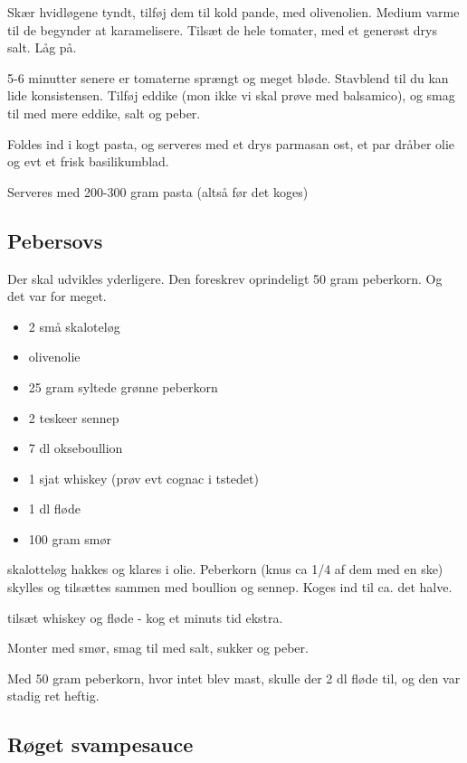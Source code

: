 \documentclass[
  letterpaper,
  DIV=11,
  numbers=noendperiod]{scrreprt}
\providecommand{\tightlist}{%
  \setlength{\itemsep}{0pt}\setlength{\parskip}{0pt}}\usepackage{longtable,booktabs,array}
\begin{document}
Skær hvidløgene tyndt, tilføj dem til kold pande, med olivenolien.
Medium varme til de begynder at karamelisere. Tilsæt de hele tomater,
med et generøst drys salt. Låg på.

5-6 minutter senere er tomaterne sprængt og meget bløde. Stavblend til
du kan lide konsistensen. Tilføj eddike (mon ikke vi skal prøve med
balsamico), og smag til med mere eddike, salt og peber.

Foldes ind i kogt pasta, og serveres med et drys parmasan ost, et par
dråber olie og evt et frisk basilikumblad.

Serveres med 200-300 gram pasta (altså før det koges)

\hypertarget{pebersovs}{%
\subsection{Pebersovs}\label{pebersovs}}

Der skal udvikles yderligere. Den foreskrev oprindeligt 50 gram
peberkorn. Og det var for meget.

\begin{itemize}
\tightlist
\item
  2 små skaloteløg
\item
  olivenolie
\item
  25 gram syltede grønne peberkorn
\item
  2 teskeer sennep
\item
  7 dl okseboullion
\item
  1 sjat whiskey (prøv evt cognac i tstedet)
\item
  1 dl fløde
\item
  100 gram smør
\end{itemize}

skalotteløg hakkes og klares i olie. Peberkorn (knus ca 1/4 af dem med
en ske) skylles og tilsættes sammen med boullion og sennep. Koges ind
til ca. det halve.

tilsæt whiskey og fløde - kog et minuts tid ekstra.

Monter med smør, smag til med salt, sukker og peber.

Med 50 gram peberkorn, hvor intet blev mast, skulle der 2 dl fløde til,
og den var stadig ret heftig.

\hypertarget{ruxf8get-svampesauce}{%
\subsection{Røget svampesauce}\label{ruxf8get-svampesauce}}
\end{document}

